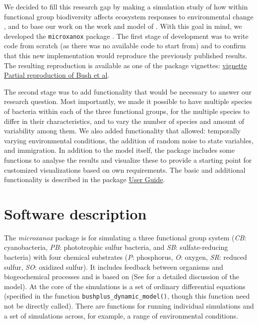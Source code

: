 \documentclass[]{elsarticle} %
\begin{document}
We decided to fill this research gap by making a simulation study of how within functional group biodiversity affects ecosystem responses to environmental change \citet{Limberger2023}, and to base our work on the work and model of \citet{Bush2017}. With this goal in mind, we developed the \texttt{microxanox} package \citep{Krug2022}. The first stage of development was to write code from scratch (as there was no available code to start from) and to confirm that this new implementation would reproduce the previously published results. The resulting reproduction is available as one of the package vignettes: \href{https://uzh-peg.r-universe.dev/articles/microxanox/partial-reproduction-Bushetal2017.html}{vignette Partial reproduction of Bush et al}.

The second stage was to add functionality that would be necessary to answer our research question. Most importantly, we made it possible to have multiple species of bacteria within each of the three functional groups, for the multiple species to differ in their characteristics, and to vary the number of species and amount of variability among them. We also added functionality that allowed: temporally varying environmental conditions, the addition of random noise to state variables, and immigration. In addition to the model itself, the package includes some functions to analyse the results and visualize these to provide a starting point for customized visualizations based on own requirements. The basic and additional functionality is described in the package \href{https://uzh-peg.r-universe.dev/articles/microxanox/User-guide.html}{User Guide}.

\hypertarget{software-description}{%
\section{Software description}\label{software-description}}

The \emph{microxanox} package is for simulating a three functional group system (\emph{CB}: cyanobacteria, \emph{PB}: phototrophic sulfur bacteria, and \emph{SB}: sulfate-reducing bacteria) with four chemical substrates (\emph{P}: phosphorus, \emph{O}: oxygen, \emph{SR}: reduced sulfur, \emph{SO}: oxidized sulfur). It includes feedback between organisms and biogeochemical processes and is based on \citet{Bush2017} (See \citet{Bush2017} for a detailed discussion of the model). At the core of the simulations is a set of ordinary differential equations (specified in the function \texttt{bushplus\_dynamic\_model()}, though this function need not be directly called). There are functions for running individual simulations and a set of simulations across, for example, a range of environmental conditions.
\end{document}
